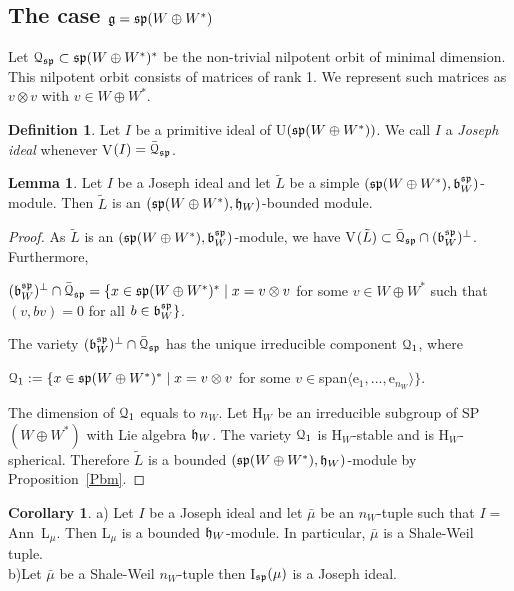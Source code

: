 \documentclass[12pt]{amsart}
\theoremstyle{definition}\newtheorem{theorem}{Theorem}[section]
\newtheorem{lemma}[proposition]{Lemma}
\newtheorem{corollary}[proposition]{Corollary}
\theoremstyle{definition}\newtheorem{definition}[proposition]{Definition}
\theoremstyle{remark}\newtheorem{example}[proposition]{Example}
\begin{document}
\subsection{The case $\frak g=\frak{sp}(W\oplus W^*)$}\label{SSJisp} Let $\EuScript Q_\frak{sp}\subset\frak{sp}(W\oplus W^*)^*$ be the non-trivial nilpotent orbit of minimal dimension. This nilpotent orbit consists of matrices of rank 1. We represent such matrices as $v\otimes v$ with $v\in W\oplus W^*$.
\begin{definition} Let $I$ be a primitive ideal of U$(\frak{sp}(W\oplus W^*))$. We call $I$ a {\it Joseph ideal} whenever V$(I)=\bar{\EuScript Q}_\frak{sp}$.\end{definition}
\begin{lemma} Let $I$ be a Joseph ideal and let $\tilde L$ be a simple $(\frak{sp}(W\oplus W^*), \frak b^\frak{sp}_W)$-module. Then $\tilde L$ is an $(\frak{sp}(W\oplus W^*), \frak h_W)$-bounded module.\end{lemma}
\begin{proof} As $\tilde L$ is an $(\frak{sp}(W\oplus W^*), \frak b^\frak{sp}_W)$-module, we have V$(\tilde L)\subset\bar{\EuScript Q}_\frak{sp}\cap(\frak b^\frak{sp}_W)^\bot$. Furthermore,\begin{center}
$(\frak b^\frak{sp}_W)^\bot\cap\bar{\EuScript Q}_\frak{sp}=\{x\in\frak{sp}(W\oplus W^*)^*\mid x=v\otimes v$ for some $v\in W\oplus W^*$ such that $(v, bv)=0$ for all $b\in\frak b^\frak{sp}_W\}$.\end{center}
The variety $(\frak b^\frak{sp}_W)^\bot\cap\bar{\EuScript Q}_\frak{sp}$ has the unique irreducible component $\EuScript Q_1$, where
\begin{center}$\EuScript Q_1:=\{x\in\frak{sp}(W\oplus W^*)^*\mid x=v\otimes v$ for some $v\in$span$\langle$e$_1, ..., $e$_{n_W} \rangle\}$.\end{center}
The dimension of $\EuScript Q_1$ equals to $n_W$. Let H$_W$ be an irreducible subgroup of SP$(W\oplus W^*)$ with Lie algebra $\frak h_W$. The variety $\EuScript Q_1$ is H$_W$-stable and is H$_W$-spherical. Therefore $\tilde L$ is a bounded $(\frak{sp}(W\oplus W^*), \frak h_W)$-module  by Proposition~\ref{Pbm}.\end{proof}
\begin{corollary}\label{Cqtosw}a) Let $I$ be a Joseph ideal and let $\bar\mu$ be an $n_W$-tuple such that $I=$Ann~L$_\mu$. Then L$_\mu$ is a bounded $\frak h_W$-module. In particular, $\bar\mu$ is a Shale-Weil tuple.\\b)Let $\bar\mu$ be a Shale-Weil $n_W$-tuple then I$_{\frak{sp}}(\mu)$ is a Joseph ideal.\end{corollary}
\end{document}

